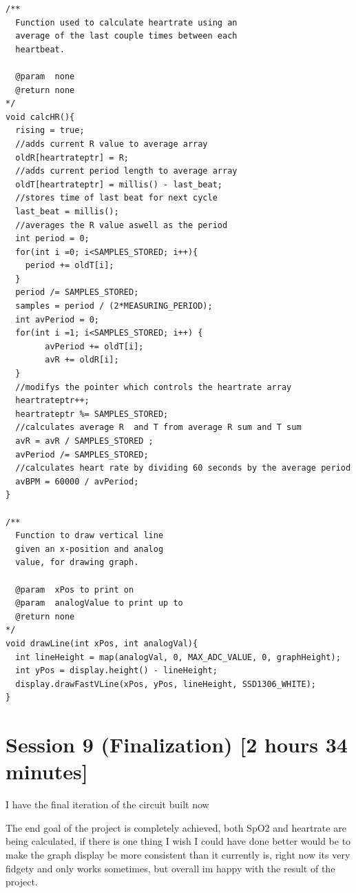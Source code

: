 \documentclass{article}
\begin{document}
\begin{lstlisting}[language=Arduino, caption= Complete  Code]
/**
  Function used to calculate heartrate using an
  average of the last couple times between each
  heartbeat.

  @param  none
  @return none
*/
void calcHR(){
  rising = true;
  //adds current R value to average array
  oldR[heartrateptr] = R;
  //adds current period length to average array
  oldT[heartrateptr] = millis() - last_beat;
  //stores time of last beat for next cycle
  last_beat = millis();
  //averages the R value aswell as the period
  int period = 0;
  for(int i =0; i<SAMPLES_STORED; i++){
    period += oldT[i];
  }
  period /= SAMPLES_STORED;
  samples = period / (2*MEASURING_PERIOD);
  int avPeriod = 0;
  for(int i =1; i<SAMPLES_STORED; i++) {
        avPeriod += oldT[i];
        avR += oldR[i];
  }  
  //modifys the pointer which controls the heartrate array
  heartrateptr++;
  heartrateptr %= SAMPLES_STORED;
  //calculates average R  and T from average R sum and T sum
  avR = avR / SAMPLES_STORED ;
  avPeriod /= SAMPLES_STORED;
  //calculates heart rate by dividing 60 seconds by the average period
  avBPM = 60000 / avPeriod;
}

/**
  Function to draw vertical line
  given an x-position and analog
  value, for drawing graph.

  @param  xPos to print on
  @param  analogValue to print up to  
  @return none
*/
void drawLine(int xPos, int analogVal){
  int lineHeight = map(analogVal, 0, MAX_ADC_VALUE, 0, graphHeight);
  int yPos = display.height() - lineHeight;
  display.drawFastVLine(xPos, yPos, lineHeight, SSD1306_WHITE);
}
\end{lstlisting}
\newpage
\section{Session 9 (Finalization) [2 hours 34 minutes]}
I have the final iteration of the circuit built now
\begin{center}
\end{center}
The end goal of the project is completely achieved, both SpO2 and heartrate are being calculated, if there is one thing I wish I could have done better would be to make the graph display be more consistent than it currently is, right now its very fidgety and only works sometimes, but overall im happy with the result of the project.
\end{document}
